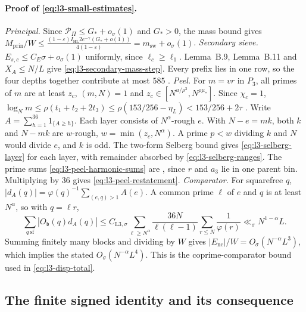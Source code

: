 \paragraph{Proof of \eqref{eq:l3-small-estimates}.}
\emph{Principal.} Since $\mathcal P_\Pi\le G_*+o_\sigma(1)$ and $G_*>0$,
the mass bound gives
$M_{\mathrm{prin}}/W\le\frac{(1-\varepsilon)I_{\mathrm{HL}}2e^{-\gamma}(G_*+o(1))}{4(1-\varepsilon)}
=m_{\mathrm{sw}}+o_\sigma(1)$.
\emph{Secondary sieve.} $E_{s,c}\le C_E\sigma+o_\sigma(1)$ uniformly,
since $\ell_c\ge\ell_1$. Lemma~B.9, Lemma~B.11 and $X_A\le N/L$ give
\eqref{eq:l3-secondary-mass-step}. Every prefix lies in one row, so the
four depths together contribute at most $585$ \cite[(B.9), (B.11)]{PaperII}.
\emph{Peel.} For $m=vr$ in $P_3$, all primes of $m$ are at least $z_c$,
$(m,N)=1$ and $z_c\in[N^{u/\rho^3},N^{\rho\mu_*}]$. Since $\chi_c=1$,
$\log_Nm\le\rho(t_1+t_2+2t_3)\le\rho(153/256-\eta_L)<153/256+2\tau$
\cite[(4.55)]{PaperII}. Write $A=\sum_{h=1}^{36}1_{\{A\ge h\}}$.
Each layer consists of $N^\alpha$-rough $e$. With $N-e=mk$, both $k$ and
$N-mk$ are $w$-rough, $w=\min(z_c,N^\alpha)$. A prime $p<w$ dividing $k$
and $N$ would divide $e$, and $k$ is odd. The two-form Selberg bound
\cite[(4.48)--(4.54)]{PaperII} gives \eqref{eq:l3-selberg-layer} for each
layer, with remainder absorbed by \eqref{eq:l3-selberg-ranges}. The prime
sums \eqref{eq:l3-peel-harmonic-sums} are \cite[(4.56)]{PaperII}, since
$r$ and $a_3$ lie in one parent bin. Multiplying by $36$ gives
\eqref{eq:l3-peel-restatement}.
\emph{Comparator.} For squarefree $q$,
$|d_A(q)|=\varphi(q)^{-1}\sum_{(e,q)>1}A(e)$. A common prime $\ell$ of
$e$ and $q$ is at least $N^\alpha$, so with $q=\ell r$,
\[
 \sum_{q\ \mathrm{sf}}|O_{\mathfrak b}(q)d_A(q)|
 \le C_{\mathrm{L3},\sigma}\sum_{\ell\ge N^\alpha}\frac{36N}{\ell(\ell-1)}
     \sum_{r\le N}\frac1{\varphi(r)}\ll_\sigma N^{1-\alpha}L.
\]
Summing finitely many blocks and dividing by $W$ gives
$|E_{\mathrm{nc}}|/W=O_\sigma(N^{-\alpha}L^3)$, which implies the stated
$O_\sigma(N^{-\alpha}L^4)$. This is the coprime-comparator bound used in
\eqref{eq:l3-disp-total}.

\subsection{The finite signed identity and its consequence}

